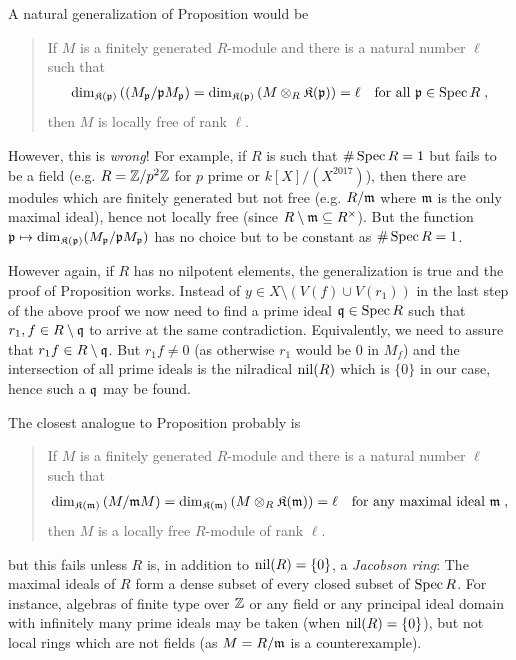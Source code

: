 \documentclass[a4paper,parskip=half,numbers=enddot, DIV=12]{scrreprt}
\begin{document}
\begin{rem*}
    \begin{alphanumerate}
      \item 
        A natural generalization of Proposition  would be
        \begin{quote}
            If $M$ is a finitely generated $R$-module and there is a natural number $\ell$ such that
            \begin{align*}
            	\dim_{\mathfrak{K}(\mathfrak{p})}\left((M_{\mathfrak{p}}/\mathfrak{p} M_{\mathfrak{p}}\right) = \dim_{\mathfrak{K}(\mathfrak{p})}\left( M \otimes_R \mathfrak{K}(\mathfrak{p})\right)=\ell\quad\text{for all }\mathfrak{p}\in \operatorname{Spec} R\;,
            \end{align*}
             then $M$ is locally free of rank $\ell$.
        \end{quote}
        However, this is \emph{wrong}! For example, if $R$ is such that $\#\operatorname{Spec} R=1$ but fails to be a field (e.g. $R=\mathbb{Z}/p^2\mathbb{Z}$ for $p$ prime or $k[X]/(X^{2017})$), then there are modules which are finitely generated but not free (e.g. $R/\mathfrak{m}$ where $\mathfrak{m}$ is the only maximal ideal), hence not locally free (since $R\setminus \mathfrak{m}\subseteq R^\times$). But the function $\mathfrak{p}\mapsto \dim_{\mathfrak{K}(\mathfrak{p})}(M_{\mathfrak{p}}/\mathfrak{p} M_{\mathfrak{p}})$ has no choice but to be constant as $\#\operatorname{Spec} R = 1$. 
        
        However again,  if $R$ has no nilpotent elements, the generalization is true and the proof of Proposition  works. Instead of $y\in X\setminus(V(f)\cup V(r_1))$ in the last step of the above proof we now need to find a prime ideal $\mathfrak{q}\in\operatorname{Spec} R$ such that $r_1,f\in R\setminus\mathfrak{q}$ to arrive at the same contradiction. Equivalently, we need to assure that $r_1f\in R\setminus\mathfrak{q}$. But $r_1f\not=0$ (as otherwise $r_1$ would be $0$ in $M_f$) and the intersection of all prime ideals is the nilradical $\operatorname{nil}(R)$ which is $\{0\}$ in our case, hence such a $\mathfrak{q}$ may be found.
      \item 
        The closest analogue to Proposition  probably is
        \begin{quote}
            If $M$ is a finitely generated $R$-module and there is a natural number $\ell$ such that 
            \begin{align*}
            	\dim_{\mathfrak{K}(\mathfrak{m})} \left(M/\mathfrak{m} M\right) = \dim_{\mathfrak{K}(\mathfrak{m})} \left(M\otimes_R \mathfrak{K}(\mathfrak{m})\right) = \ell\quad\text{for any maximal ideal }\mathfrak{m}\;, 
            \end{align*}
            then $M$ is a locally free $R$-module of rank $\ell$.
        \end{quote}
        but this fails unless $R$ is, in addition to $\operatorname{nil}(R) = \{0\}$, a \emph{Jacobson ring}: The maximal ideals of $R$ form a dense subset of every closed subset of $\operatorname{Spec} R$. For instance, algebras of finite type over $\mathbb{Z}$ or any field or any principal ideal domain with infinitely many prime ideals may be taken (when $\operatorname{nil}(R) = \{0\}$), but not local rings which are not fields (as $M=R/\mathfrak{m}$ is a counterexample).

    \end{alphanumerate}
\end{rem*}
\end{document}
